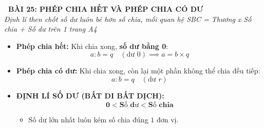 \documentclass[12pt,a4paper]{article}
\begin{document}
\begin{tcolorbox}[
  enhanced,
  colback=teal!8!white,
  colframe=teal!70!black,
  arc=3mm, boxrule=1.2pt,
  left=3mm, right=3mm, top=2mm, bottom=2mm,
  halign=center
]
  {\LARGE\bfseries\color{teal!90!black}\faBookmark\ BÀI 25: PHÉP CHIA HẾT VÀ PHÉP CHIA CÓ DƯ}\\[1mm]
  {\itshape\footnotesize\color{black!75} Định lí then chốt số dư luôn bé hơn số chia, mối quan hệ SBC = Thương x Số chia + Số dư trên 1 trang A4}
\end{tcolorbox}

\vspace{-2mm}

\noindent
\begin{minipage}[t]{0.49\textwidth}\vspace{0pt}
\begin{tcolorbox}[
  enhanced,
  colback=blue!4!white,
  colframe=blue!75!black,
  arc=2mm, boxrule=0.8pt,
  left=2mm, right=2mm, top=1.8mm, bottom=1.8mm,
  title={\footnotesize\bfseries\color{white}\faShareAlt\ 1. Phép chia hết \& Chia có dư}
]
{\footnotesize
\begin{itemize}\setlength{\itemsep}{1pt}\setlength{\leftskip}{-2.5mm}
  \item \textbf{Phép chia hết:} Khi chia xong, \textbf{số dư bằng 0}:
  $$a : b = q\quad (\text{dư } 0) \implies a = b \times q$$
  \item \textbf{Phép chia có dư:} Khi chia xong, còn lại một phần không thể chia đều tiếp:
  $$a : b = q\quad (\text{dư } r)$$
  \item \textbf{ĐỊNH LÍ SỐ DƯ (BẤT DI BẤT DỊCH):}
  $$\mathbf{0 < \text{Số dư} < \text{Số chia}}$$
  \begin{itemize}\setlength{\itemsep}{0.5pt}\setlength{\leftskip}{-2.5mm}
    \item Số dư lớn nhất luôn kém số chia đúng $1$ đơn vị.
  \end{itemize}
\end{itemize}
}
\end{tcolorbox}
\end{minipage}
\hfill
\end{document}
